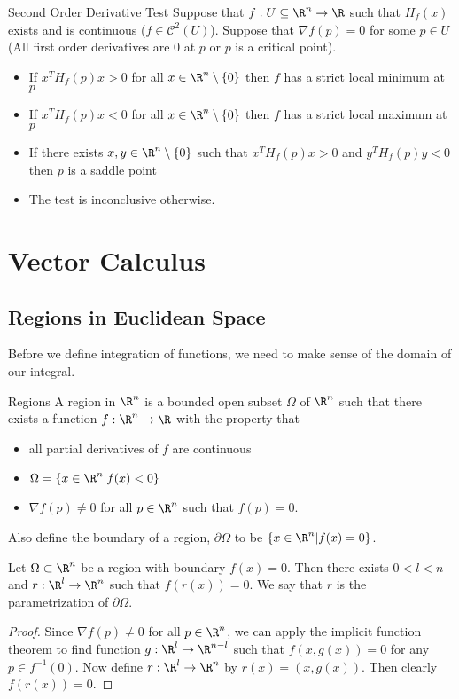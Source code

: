 \documentclass[a4paper]{article}
\begin{document}
\begin{thm}{Second Order Derivative Test}{} Suppose that $f:U\subseteq\R^n\to\R$ such that $H_f(x)$ exists and is continuous ($f\in\mathcal{C}^2(U)$). Suppose that $\nabla f(p)=0$ for some $p\in U$ (All first order derivatives are $0$ at $p$ or $p$ is a critical point). 
\begin{itemize}
\item If $x^TH_f(p)x>0$ for all $x\in\R^n\setminus\{0\}$ then $f$ has a strict local minimum at $p$
\item If $x^TH_f(p)x<0$ for all $x\in\R^n\setminus\{0\}$ then $f$ has a strict local maximum at $p$
\item If there exists $x,y\in\R^n\setminus\{0\}$ such that $x^TH_f(p)x>0$ and $y^TH_f(p)y<0$ then $p$ is a saddle point
\item The test is inconclusive otherwise. 
\end{itemize}
\end{thm}

\pagebreak
\section{Vector Calculus}
\subsection{Regions in Euclidean Space}
Before we define integration of functions, we need to make sense of the domain of our integral. 

\begin{defn}{Regions}{} A region in $\R^n$ is a bounded open subset $\Omega$ of $\R^n$ such that there exists a function $f:\R^n\to\R$ with the property that 
\begin{itemize}
\item all partial derivatives of $f$ are continuous
\item $\Omega=\{x\in\R^n|f(x)<0\}$
\item $\nabla f(p)\neq 0$ for all $p\in\R^n$ such that $f(p)=0$. 
\end{itemize}
Also define the boundary of a region, $\partial\Omega$ to be $\{x\in\R^n|f(x)=0\}$. 
\end{defn}

\begin{prp}{}{} Let $\Omega\subset\R^n$ be a region with boundary $f(x)=0$. Then there exists $0<l<n$ and $r:\R^l\to\R^n$ such that $f(r(x))=0$. We say that $r$ is the parametrization of $\partial\Omega$. \tcbline
\begin{proof}
Since $\nabla f(p)\neq 0$ for all $p\in\R^n$, we can apply the implicit function theorem to find function $g:\R^l\to\R^{n-l}$ such that $f(x,g(x))=0$ for any $p\in f^{-1}(0)$. Now define $r:\R^l\to\R^n$ by $r(x)=(x,g(x))$. Then clearly $f(r(x))=0$. 
\end{proof}
\end{prp}
\end{document}
